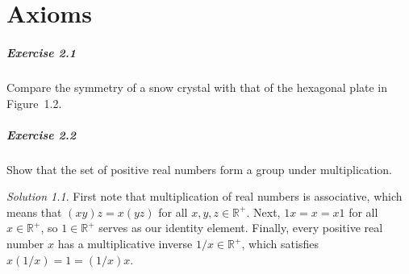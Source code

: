 \documentclass[11pt]{report}
\def\R{\mathbb{R}}
\theoremstyle{remark}
\newtheorem*{solution}{Solution}
\begin{document}
    

    \chapter{Axioms}

    \paragraph{Exercise 2.1} Compare the symmetry of a snow crystal with that of the
    hexagonal plate in Figure~1.2.

    \paragraph{Exercise 2.2} Show that the set of positive real numbers form a group
    under multiplication.
    \begin{solution}
        First note that multiplication of real numbers is associative, which means
        that $(xy)z = x(yz)$ for all $x, y, z \in \R^+$. Next, $1x = x = x1$ for all
        $x \in \R^+$, so $1 \in \R^+$ serves as our identity element. Finally, every
        positive real number $x$ has a multiplicative inverse $1 / x \in \R^+$,
        which satisfies $x(1 / x) = 1 = (1 / x) x$.
    \end{solution}
\end{document}
